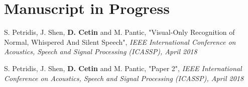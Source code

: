 \section{Manuscript in Progress}



\item {S. Petridis, J. Shen, \textbf{D. Cetin} and M. Pantic, "Visual-Only Recognition of Normal, Whispered And Silent Speech", \textit{IEEE International Conference on Acoustics, Speech and Signal Processing (ICASSP), April 2018}} 

\item {S. Petridis, J. Shen, \textbf{D. Cetin} and M. Pantic, "Paper 2", \textit{IEEE International Conference on Acoustics, Speech and Signal Processing (ICASSP), April 2018}}


